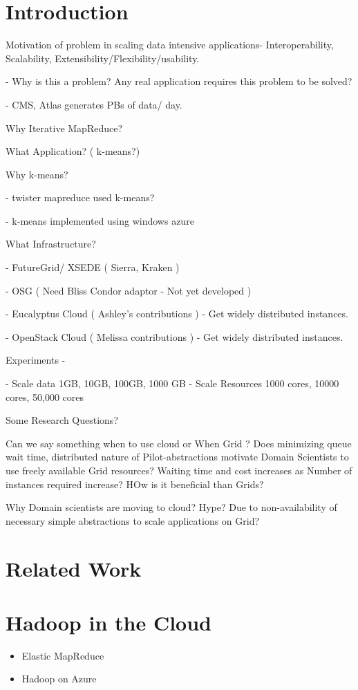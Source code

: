 \documentclass[times]{cpeauth}
\begin{document}

\vspace{-6pt}

\section{Introduction}
\vspace{-2pt}
Motivation of problem in scaling data intensive applications- 
Interoperability, Scalability, Extensibility/Flexibility/usability.

   - Why is this a problem? Any real application requires this problem to be solved?

   - CMS, Atlas generates PBs of data/ day.

Why Iterative MapReduce?

What Application?  ( k-means?)

Why k-means?

  - twister mapreduce used k-means?

  - k-means implemented using windows azure

What Infrastructure?

  - FutureGrid/ XSEDE ( Sierra, Kraken )

  - OSG ( Need Bliss Condor adaptor - Not yet developed )

  - Eucalyptus Cloud ( Ashley's contributions )
    - Get widely distributed instances. 

  - OpenStack Cloud ( Melissa contributions )
    - Get widely distributed instances. 

Experiments -

  - Scale data 1GB, 10GB, 100GB, 1000 GB
  - Scale Resources 1000 cores, 10000 cores, 50,000 cores


Some Research Questions?
 
Can we say something when to use cloud or When Grid ? 
Does minimizing queue wait time, distributed nature of Pilot-abstractions motivate Domain Scientists to use freely available Grid resources? 
Waiting time and cost increases as Number of instances required increase? 
HOw is it beneficial than Grids? 

Why Domain scientists are moving to cloud? Hype? Due to non-availability of necessary simple abstractions to scale applications on Grid?


\section{Related Work}

\section{Hadoop in the Cloud}

\begin{itemize}
	\item Elastic MapReduce
	\item Hadoop on Azure
\end{itemize}



\end{document}
